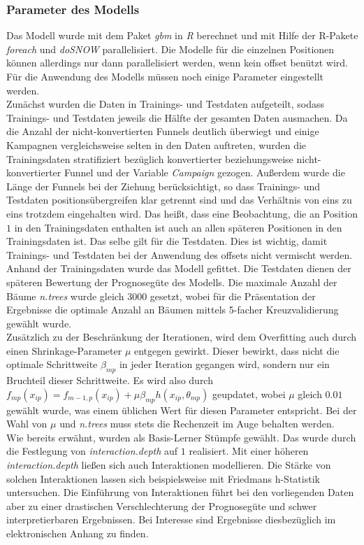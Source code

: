 \subsubsection*{Parameter des Modells}

Das Modell wurde mit dem Paket \textit{gbm} \cite{gbm} in \textit{R} \cite{r} berechnet und mit Hilfe der R-Pakete \textit{foreach} \cite{foreach} und \textit{doSNOW} \cite{dosnow} parallelisiert. Die Modelle für die einzelnen Positionen können allerdings nur dann parallelisiert werden, wenn kein offset benützt wird. Für die Anwendung des Modells müssen noch einige Parameter eingestellt werden.\\
Zunächst wurden die Daten in Trainings- und Testdaten aufgeteilt, sodass Trainings- und Testdaten jeweils die Hälfte der gesamten Daten ausmachen. Da die Anzahl der nicht-konvertierten Funnels deutlich überwiegt und einige Kampagnen vergleichsweise selten in den Daten auftreten, wurden die Trainingsdaten stratifiziert bezüglich konvertierter beziehungsweise nicht-konvertierter Funnel und der Variable \textit{Campaign} gezogen. Außerdem wurde die Länge der Funnels bei der Ziehung berücksichtigt, so dass  Trainings- und Testdaten positionsübergreifen klar getrennt sind und das Verhältnis von eins zu eins trotzdem eingehalten wird. Das heißt, dass eine Beobachtung, die an Position $1$ in den Trainingsdaten enthalten ist auch an allen späteren Positionen in den Trainingsdaten ist. Das selbe gilt für die Testdaten. Dies ist wichtig, damit Trainings- und Testdaten bei der Anwendung des offsets nicht vermischt werden. Anhand der Trainingsdaten wurde das Modell gefittet. Die Testdaten dienen der späteren Bewertung der Prognosegüte des Modells. Die maximale Anzahl der Bäume \textit{n.trees} wurde gleich $3000$ gesetzt, wobei für die Präsentation der Ergebnisse die optimale Anzahl an Bäumen mittels 5-facher Kreuzvalidierung gewählt wurde.\\
Zusätzlich zu der Beschränkung der Iterationen, wird dem Overfitting auch durch einen Shrinkage-Parameter $\mu$ entgegen gewirkt. Dieser bewirkt, dass nicht die optimale Schrittweite $\beta_{mp}$ in jeder Iteration gegangen wird, sondern nur ein Bruchteil dieser Schrittweite. Es wird also durch $f_{mp}(x_{ip}) = f_{m-1,p}(x_{ip}) + \mu \beta_{mp} h(x_{ip},\theta_{mp})$ geupdatet, wobei $\mu$ gleich $0.01$ gewählt wurde, was einem üblichen Wert für diesen Parameter entspricht. Bei der Wahl von $\mu$ und \textit{n.trees} muss stets die Rechenzeit im Auge behalten werden.\\
Wie bereits erwähnt, wurden als Basis-Lerner Stümpfe gewählt. Das wurde durch die Festlegung von \textit{interaction.depth} auf $1$ realisiert. Mit einer höheren \textit{interaction.depth} ließen sich auch Interaktionen modellieren. Die Stärke von solchen Interaktionen lassen sich beispielsweise mit Friedmans h-Statistik \cite{friedman_h} untersuchen. Die Einführung von Interaktionen führt bei den vorliegenden Daten aber zu einer drastischen Verschlechterung der Prognosegüte und schwer interpretierbaren Ergebnissen. Bei Interesse sind Ergebnisse diesbezüglich im elektronischen Anhang zu finden.\\
